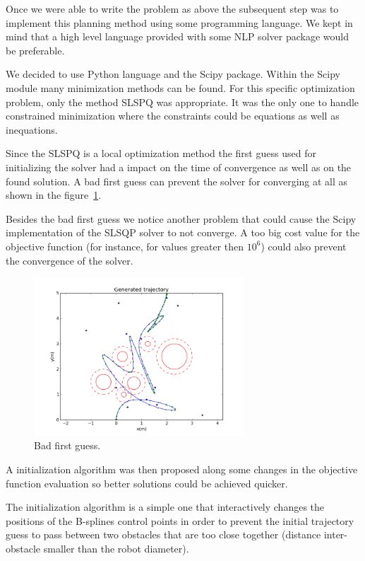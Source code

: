 Once we were able to write the problem as above the subsequent step was to implement this planning method using some programming language. We kept in mind that a high level language provided with some NLP solver package would be preferable.

We decided to use Python language and the Scipy package. Within the Scipy module many minimization methods can be found. For this specific optimization problem, only the method SLSPQ was appropriate. It was the only one to handle constrained minimization where the constraints could be equations as well as inequations.

Since the SLSPQ is a local optimization method the first guess used for initializing the solver had a impact on the time of convergence as well as on the found solution. A bad first guess can prevent the solver for converging at all as shown in the figure~\ref{fig:planning-sim-trajc}.

Besides the bad first guess we notice another problem that could cause the Scipy implementation of the SLSQP solver to not converge. A too big cost value for the objective function (for instance, for values greater then $10^6$) could also prevent the convergence of the solver.

\begin{figure}[!h]
	\centering
	\includegraphics[width=0.7\textwidth]{./images/planning-sim-trajc.png}
	\caption{Bad first guess.\label{fig:planning-sim-trajc}}
\end{figure}

A initialization algorithm was then proposed along some changes in the objective function evaluation so better solutions could be achieved quicker.

The initialization algorithm is a simple one that interactively changes the positions of the B-splines control points in order to prevent the initial trajectory guess to pass between two obstacles that are too close together (distance inter-obstacle smaller than the robot diameter).

